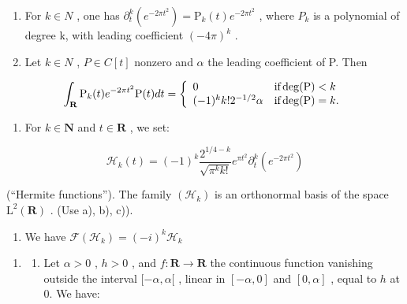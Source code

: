\begin{enumerate}
\def\labelenumi{\alph{enumi})}
\setcounter{enumi}{1}
\item
  For \(k \in N\) , one has \(\partial_{t}^{k}(e^{-2\pi t^{2}}) = \mathrm{P}_{k}(t)e^{-2\pi t^{2}}\) , where \(P_{k}\) is a polynomial of degree k, with leading coefficient \((-4\pi)^{k}\) .
\item
  Let \(k \in N\) , \(P \in C[t]\) nonzero and \(\alpha\) the leading coefficient of P. Then
\end{enumerate}

\[
\int_ {\mathbf {R}} \mathrm{P} _ {k} (t) e ^ {- 2 \pi t ^ {2}} \mathrm{P} (t)   d t = \left\{ \begin{array}{l l} 0 & \text {if} \deg (\mathrm{P}) <   k \\ (- 1) ^ {k} k! 2 ^ {- 1 / 2} \alpha & \text {if} \deg (\mathrm{P}) = k. \end{array} \right.
\]

\begin{enumerate}
\def\labelenumi{\alph{enumi})}
\setcounter{enumi}{3}
\tightlist
\item
  For \(k \in \mathbf{N}\) and \(t \in \mathbf{R}\) , we set:
\end{enumerate}

\[
\mathcal {H} _ {k} (t) = (- 1) ^ {k} \frac {2 ^ {1 / 4 - k}}{\sqrt {\pi^ {k} k !}} e ^ {\pi t ^ {2}} \partial_ {t} ^ {k} (e ^ {- 2 \pi t ^ {2}})
\]

(“Hermite functions”). The family \((\mathcal{H}_{k})\) is an orthonormal basis of the space \(\mathrm{L}^{2}(\mathbf{R})\) . (Use a), b), c)).

\begin{enumerate}
\def\labelenumi{\alph{enumi})}
\setcounter{enumi}{4}
\tightlist
\item
  We have \(\mathcal{F}(\mathcal{H}_k) = (-i)^k\mathcal{H}_k\)
\end{enumerate}

\begin{enumerate}
\def\labelenumi{\arabic{enumi})}
\setcounter{enumi}{3}
\tightlist
\item
  \begin{enumerate}
  \def\labelenumii{\alph{enumii})}
  \tightlist
  \item
    Let \(\alpha > 0\) , \(h > 0\) , and \(f: \mathbf{R} \to \mathbf{R}\) the continuous function vanishing outside the interval \([- \alpha, \alpha[\) , linear in \([- \alpha, 0]\) and \([0, \alpha]\) , equal to \(h\) at 0. We have:
  \end{enumerate}
\end{enumerate}

